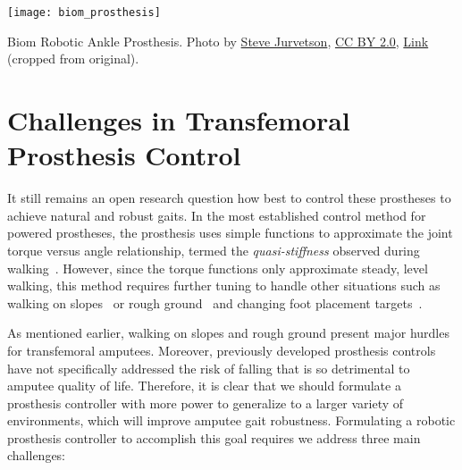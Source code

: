 \begin{marginfigure}[-1in]
    \centering
    \texttt{[image: biom\_prosthesis]}
    \caption{Biom Robotic Ankle Prosthesis. Photo by
    \href{https://www.flickr.com/photos/jurvetson/13480667874/}{Steve
    Jurvetson}, \href{http://creativecommons.org/licenses/by/2.0}{CC BY 2.0},
    \href{https://commons.wikimedia.org/w/index.php?curid=32568854}{Link}
    (cropped from original).}
    \label{fig:biom_ankle}
\end{marginfigure}

\section{Challenges in Transfemoral Prosthesis
Control}\label{sec:intro_challenges} 

It still remains an open research question how best to control these prostheses
to achieve natural and robust gaits. In the most established control method for
powered prostheses, the prosthesis uses simple functions to approximate the
joint torque versus angle relationship, termed the \emph{quasi-stiffness}
observed during walking~\citep{sup2007design, lenzi2014speed}. However, since
the torque functions only approximate steady, level walking, this method
requires further tuning to handle other situations such as walking on
slopes~\citep{sup2011upslope} or rough ground~\citep{thatte2016toward} and
changing foot placement targets~\citep{schepelmann2016evaluation}. 

As mentioned earlier, walking on slopes and rough ground present major hurdles
for transfemoral amputees. Moreover, previously developed prosthesis controls
have not specifically addressed the risk of falling that is so detrimental to
amputee quality of life. Therefore, it is clear that we should formulate a
prosthesis controller with more power to generalize to a larger variety of
environments, which will improve amputee gait robustness. Formulating a robotic
prosthesis controller to accomplish this goal requires we address three main
challenges:

